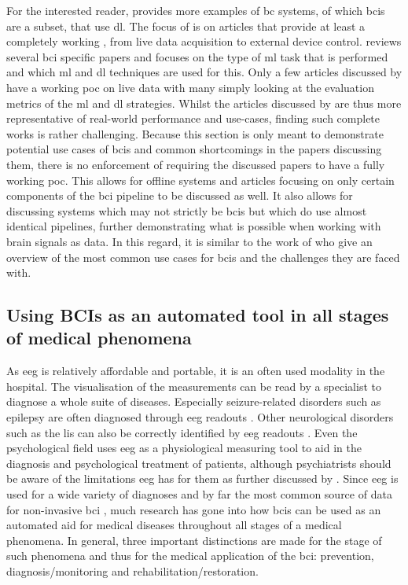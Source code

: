 For the interested reader, \citet{bci_review_arnau} provides more examples of \gls{bc} systems, of which \glspl{bci} are a subset, that use \gls{dl}.
The focus of \citet{bci_review_arnau} is on articles that provide at least a completely working , from live data acquisition to external device control.
 reviews several \gls{bci} specific papers and focuses on the type of \gls{ml} task that is performed and which \gls{ml} and \gls{dl} techniques are used for this.
Only a few articles discussed by \citet{ml_strats_used_in_papers} have a working \gls{poc} on live data with many simply looking at the evaluation metrics of the \gls{ml} and \gls{dl} strategies.
Whilst the articles discussed by \citet{bci_review_arnau} are thus more representative of real-world performance and use-cases, finding such complete works is rather challenging.
Because this section is only meant to demonstrate potential use cases of \glspl{bci} and common shortcomings in the papers discussing them, there is no enforcement of requiring the discussed papers to have a fully working \gls{poc}.
This allows for offline systems and articles focusing on only certain components of the \gls{bci} pipeline to be discussed as well.
It also allows for discussing systems which may not strictly be \glspl{bci} but which do use almost identical pipelines, further demonstrating what is possible when working with brain signals as data.
In this regard, it is similar to the work of \citet{bci_applications} who give an overview of the most common use cases for \glspl{bci} and the challenges they are faced with.


\subsection{Using BCIs as an automated tool in all stages of medical phenomena}
\label{subsec:bci_common_use_cases_medical_phenomena}

As \gls{eeg} is relatively affordable and portable, it is an often used modality in the hospital.
The visualisation of the measurements can be read by a specialist to diagnose a whole suite of diseases.
Especially seizure-related disorders such as epilepsy are often diagnosed through \gls{eeg} readouts \citep{eeg_epilepsy}.
Other neurological disorders such as the \gls{lis} can also be correctly identified by \gls{eeg} readouts \citep{eeg_lis_detection}.
Even the psychological field uses \gls{eeg} as a physiological measuring tool to aid in the diagnosis and psychological treatment of patients, although psychiatrists should be aware of the limitations \gls{eeg} has for them as further discussed by \citet{eeg_for_psychiatric}.
Since \gls{eeg} is used for a wide variety of diagnoses and by far the most common source of data for non-invasive \gls{bci} \citep[as discussed by][]{bci_review_arnau}, much research has gone into how \glspl{bci} can be used as an automated aid for medical diseases throughout all stages of a medical phenomena.
In general, three important distinctions are made for the stage of such phenomena and thus for the medical application of the \gls{bci}: prevention, diagnosis/monitoring and rehabilitation/restoration.

